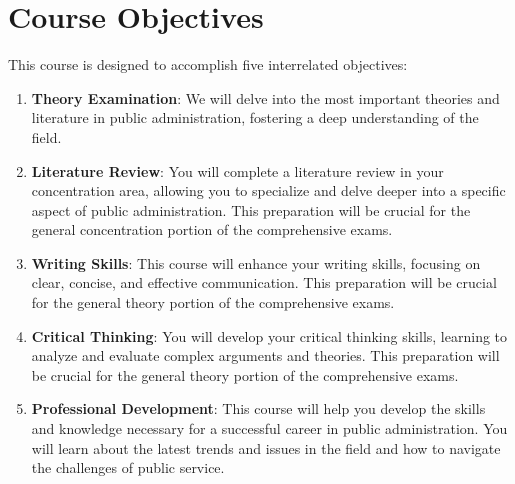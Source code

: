 \documentclass[12pt, letterpaper]{article}
\begin{document}
    \section{Course Objectives}
    This course is designed to accomplish five interrelated objectives:
    
    \begin{enumerate}
        \item \textbf{Theory Examination}: We will delve into the most important theories and literature in public administration, fostering a deep understanding of the field.
        \item \textbf{Literature Review}: You will complete a literature review in your concentration area, allowing you to specialize and delve deeper into a specific aspect of public administration. This preparation will be crucial for the general concentration portion of the comprehensive exams.
        \item \textbf{Writing Skills}: This course will enhance your writing skills, focusing on clear, concise, and effective communication. This preparation will be crucial for the general theory portion of the comprehensive exams.
        \item \textbf{Critical Thinking}: You will develop your critical thinking skills, learning to analyze and evaluate complex arguments and theories. This preparation will be crucial for the general theory portion of the comprehensive exams.
        \item \textbf{Professional Development}: This course will help you develop the skills and knowledge necessary for a successful career in public administration. You will learn about the latest trends and issues in the field and how to navigate the challenges of public service.
    
    \end{enumerate}
    
\end{document}
